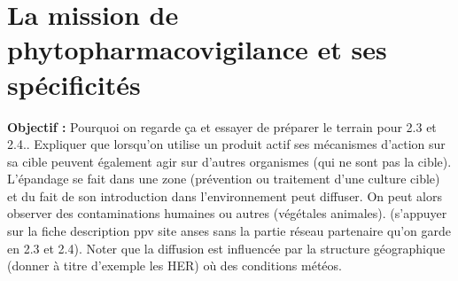 \documentclass[12pt, twoside]{report}
\begin{document}
\section{La mission de phytopharmacovigilance et ses spécificités}

\textbf{Objectif :} Pourquoi on regarde ça et essayer de préparer le terrain pour 2.3 et 2.4.. Expliquer que lorsqu'on utilise un produit actif ses mécanismes d'action sur sa cible peuvent également agir sur d'autres organismes (qui ne sont pas la cible). L'épandage se fait dans une zone (prévention ou traitement d'une culture cible) et du fait de son introduction dans l'environnement peut diffuser. On peut alors observer des contaminations humaines ou autres (végétales animales). (s'appuyer sur la fiche description ppv site anses sans la partie réseau partenaire qu'on garde en 2.3 et 2.4). Noter que la diffusion est influencée par la structure géographique (donner à titre d'exemple les HER) où des conditions météos.     








\end{document}
